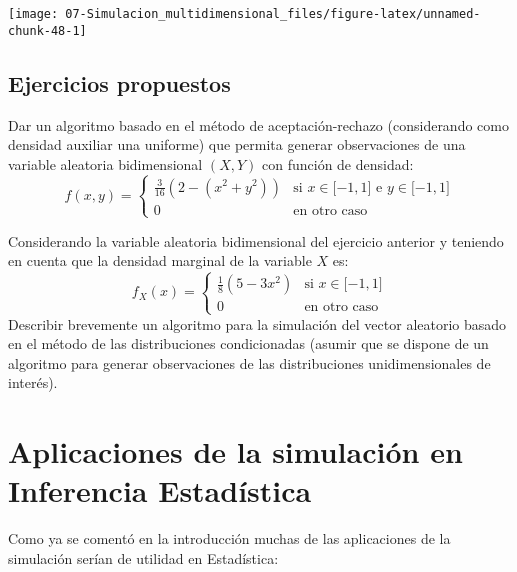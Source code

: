 \documentclass[
]{book}
\theoremstyle{break}
\theoremstyle{definition}
\theoremstyle{definition}
\theoremstyle{definition}
\theoremstyle{remark}
\let\BeginKnitrBlock\begin \let\EndKnitrBlock\end
\begin{document}
\begin{center}\texttt{[image: 07-Simulacion\_multidimensional\_files/figure-latex/unnamed-chunk-48-1]} \end{center}

\hypertarget{ejercicios-propuestos}{%
\section{Ejercicios propuestos}\label{ejercicios-propuestos}}

\BeginKnitrBlock{exercise}
\protect\hypertarget{exr:unnamed-chunk-49}{}{\label{exr:unnamed-chunk-49} }
\EndKnitrBlock{exercise}

Dar un algoritmo basado en el método de aceptación-rechazo
(considerando como densidad auxiliar una uniforme) que permita
generar observaciones de una variable aleatoria bidimensional
\(\left( X,Y\right)\) con función de densidad:
\[f(x,y)=\left\{ 
\begin{array}{cl}
\frac{3}{16}\left( 2-\left( x^2+y^2\right) \right)  & \text{si }x\in
\lbrack -1,1]\text{ e }y\in \lbrack -1,1] \\ 
0 & \text{en otro caso}
\end{array}
\right.\]

\BeginKnitrBlock{exercise}
\protect\hypertarget{exr:unnamed-chunk-50}{}{\label{exr:unnamed-chunk-50} }
\EndKnitrBlock{exercise}

Considerando la variable aleatoria bidimensional del ejercicio
anterior y teniendo en cuenta que la densidad marginal de la
variable \(X\) es:
\[f_{X}(x)=\left\{ 
\begin{array}{cl}
\frac{1}{8}\left( 5-3x^2\right)  & \text{si }x\in \lbrack -1,1] \\ 
0 & \text{en otro caso}
\end{array}
\right.\]
Describir brevemente un algoritmo para la simulación del
vector aleatorio basado en el método de las distribuciones
condicionadas (asumir que se dispone de un algoritmo para generar
observaciones de las distribuciones unidimensionales de interés).

\hypertarget{cap8}{%
\chapter{Aplicaciones de la simulación en Inferencia Estadística}\label{cap8}}

Como ya se comentó en la introducción muchas de las aplicaciones de la simulación serían de utilidad en Estadística:
\end{document}
